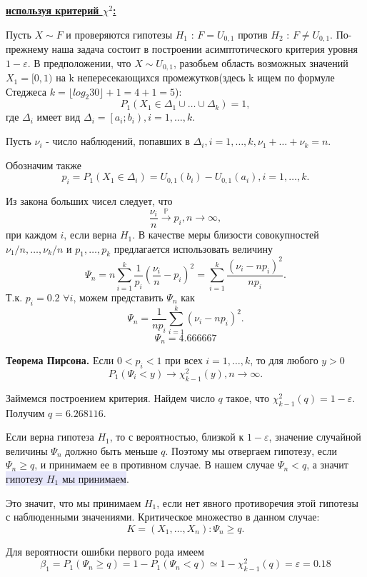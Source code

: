 \documentclass{article}
\begin{document}
\underline{\bf используя критерий $\chi^2$:}  

Пусть $X \sim F$ и проверяются гипотезы $H_1$ : $F = U_{0, 1}$ против $H_2$ : $F \neq U_{0, 1}$.
По-прежнему наша задача состоит в построении асимптотического критерия уровня
$1 - \varepsilon$. В предположении, что $X \sim U_{0, 1}$, разобьем область возможных значений $X_1 = [0, 1)$ на k непересекающихся промежутков(здесь k ищем по формуле Стеджеса $k = \lfloor log_2 30 \rfloor + 1 = 4 + 1 = 5$):
\[ P_1(X_1 \in \Delta_1 \cup \dots \cup  \Delta_k) = 1,\]
где $\Delta_i$ имеет вид $\Delta_i = \left[a_i; b_i\right), i = 1, \dots, k.$

Пусть $\nu_i$ - число наблюдений, попавших в $\Delta_i, i = 1, \dots, k, \nu_1 + \dots + \nu_k = n.$

Обозначим также 
\[p_i = P_1\left(X_1 \in \Delta_i\right) = U_{0, 1}(b_i) - U_{0, 1}(a_i), i = 1, \dots, k.\]

Из закона больших чисел следует, что 
\[ \frac{\nu_i}{n} \xrightarrow{\mathbb{P}} p_i, n \rightarrow \infty,\]
при каждом $i$, если верна $H_1$. 
В качестве меры близости совокупностей 
${\nu_1 / n, \dots, \nu_k / n}$ и ${p_1, \dots, p_k}$ предлагается использовать величину
\[\Psi_n = n \sum_{i=1}^k \dfrac{1}{p_i} \left(\dfrac{\nu_i}{n} - p_i\right)^2 = \sum_{i=1}^k \dfrac{\left(\nu_i - n p_i \right)^2}{n p_i}.\]
Т.к. $p_i = 0.2$ $\forall i$, можем представить $\Psi_n$ как
\[\Psi_n = \dfrac{1}{n p_i}\sum_{i=1}^k \left(\nu_i - n p_i \right)^2.\]
\[\Psi_n = 4.666667\] 

{\bf Теорема Пирсона.} Если $0 < p_i < 1$ при всех $i = 1, \dots, k$, то для любого $y > 0$
\[P_1(\Psi_i < y) \rightarrow \chi_{k - 1}^2(y), n \rightarrow \infty .\]

Займемся построением критерия. Найдем число $q$ такое, что $\chi_{k-1}^2(q) = 1 - \varepsilon.$ Получим $q = 6.268116.$ 

Если верна гипотеза $H_1$, то с вероятностью, близкой к $1 - \varepsilon$, значение случайной величины $\Psi_n$ должно быть меньше $q$. Поэтому мы отвергаем гипотезу, если $\Psi_n \geqslant q$, и принимаем ее в противном случае. В нашем случае $\Psi_n < q$, а значит \colorbox{Lavender}{гипотезу $H_1$ мы принимаем}. 

Это значит, что мы принимаем $H_1$, если нет явного противоречия этой гипотезы с наблюденными значениями. Критическое множество в данном случае: 
\[K = {(X_1, \dots, X_n) : \Psi_n \geqslant q}.\]

Для вероятности ошибки первого рода имеем 
\[\beta_1 = P_1 \left( \Psi_n \geqslant q \right) = 1 - P_1 \left(\Psi_n < q\right) \simeq 1 - \chi_{k - 1}^2(q) = \varepsilon = 0.18\] 
\end{document}

